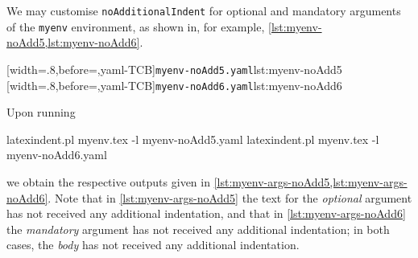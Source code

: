 \documentclass[10pt]{article}
\begin{document}
 \begin{example}
 We may customise \texttt{noAdditionalIndent} for optional and mandatory arguments of the
 \texttt{myenv} environment, as shown in, for example,
 \cref{lst:myenv-noAdd5,lst:myenv-noAdd6}.

 \begin{cmhtcbraster}
  [width=.8\linewidth,before=\centering,yaml-TCB]{\texttt{myenv-noAdd5.yaml}}{lst:myenv-noAdd5}
  [width=.8\linewidth,before=\centering,yaml-TCB]{\texttt{myenv-noAdd6.yaml}}{lst:myenv-noAdd6}
 \end{cmhtcbraster}

 Upon running 

 \begin{commandshell}
latexindent.pl myenv.tex -l myenv-noAdd5.yaml  
latexindent.pl myenv.tex -l myenv-noAdd6.yaml  
\end{commandshell}

 we obtain the respective outputs given in
 \cref{lst:myenv-args-noAdd5,lst:myenv-args-noAdd6}. Note that in
 \cref{lst:myenv-args-noAdd5} the text for the \emph{optional} argument has not received
 any additional indentation, and that in \cref{lst:myenv-args-noAdd6} the
 \emph{mandatory} argument has not received any additional indentation; in both cases,
 the \emph{body} has not received any additional indentation.

 \begin{cmhtcbraster}
 \end{cmhtcbraster}
 \end{example}
\end{document}
